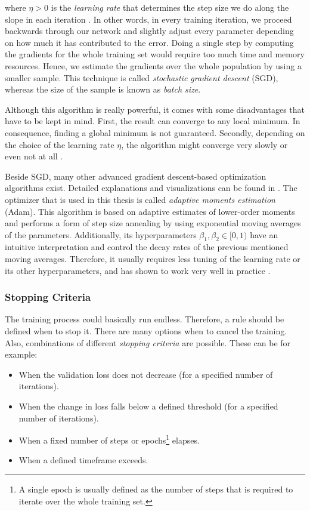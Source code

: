 where $ \eta > 0 $ is the \textit{learning rate} that determines the step size we do along the slope in each iteration \parencite{pattern_and_ml}. In other words, in every training iteration, we proceed backwards through our network and slightly adjust every parameter depending on how much it has contributed to the error. Doing a single step by computing the gradients for the whole training set would require too much time and memory resources. Hence, we estimate the gradients over the whole population by using a smaller sample. This technique is called \textit{stochastic gradient descent} (SGD), whereas the size of the sample is known as \textit{batch size}.

Although this algorithm is really powerful, it comes with some disadvantages that have to be kept in mind. First, the result can converge to any local minimum. In consequence, finding a global minimum is not guaranteed. Secondly, depending on the choice of the learning rate $ \eta $, the algorithm might converge very slowly or even not at all \parencite{ann}.

Beside SGD, many other advanced gradient descent-based optimization algorithms exist. Detailed explanations  and visualizations can be found in \parencite{optimization}. The optimizer that is used in this thesis is called \textit{adaptive moments estimation} (Adam). This algorithm is based on adaptive estimates of lower-order moments and performs a form of step size annealing by using exponential moving averages of the parameters. Additionally, its hyperparameters $ \beta_1, \beta_2 \in [0, 1) $ have an intuitive interpretation and control the decay rates of the previous mentioned moving averages. Therefore, it usually requires less tuning of the learning rate or its other hyperparameters, and has shown to work very well in practice \parencite{adam}.


\subsubsection{Stopping Criteria}

The training process could basically run endless. Therefore, a rule should be defined when to stop it. There are many options when to cancel the training. Also, combinations of different \textit{stopping criteria} are possible. These can be for example:

\begin{itemize}
\item When the validation loss does not decrease (for a specified number of iterations).
\item When the change in loss falls below a defined threshold (for a specified number of iterations).
\item When a fixed number of steps or epochs\footnote{A single epoch is usually defined as the number of steps that is required to iterate over the whole training set.} elapses.
\item When a defined timeframe exceeds.
\end{itemize}


